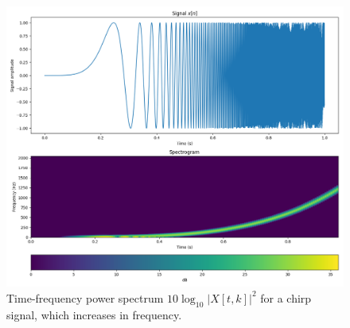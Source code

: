 \begin{figure}
    \begin{center}
        \includegraphics[width=\textwidth]{code/023_dynamic_spectrum/dynspec.png}
    \end{center}
    \caption{Time-frequency power spectrum $10 \log_{10}|X[t,k]|^2$ for a chirp signal, which increases in frequency.}
    \label{fig:dynamic_spectrum_ex}
\end{figure}





